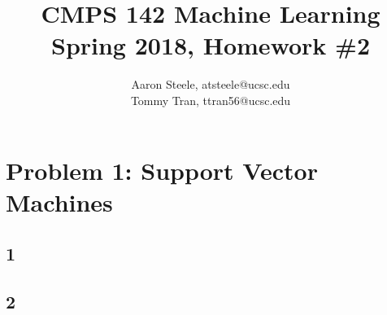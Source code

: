 \documentclass[12pt]{article}
\title{\textbf{CMPS 142 Machine Learning\\ Spring 2018, Homework \#2}}
\date{}
\author{Aaron Steele, atsteele@ucsc.edu\\
	Tommy Tran, ttran56@ucsc.edu}
\begin{document}
	
	\maketitle
	
	\section*{Problem 1: Support Vector Machines }
	\subsection*{1}
	
	
	
	\subsection*{2}
	
\end{document}
